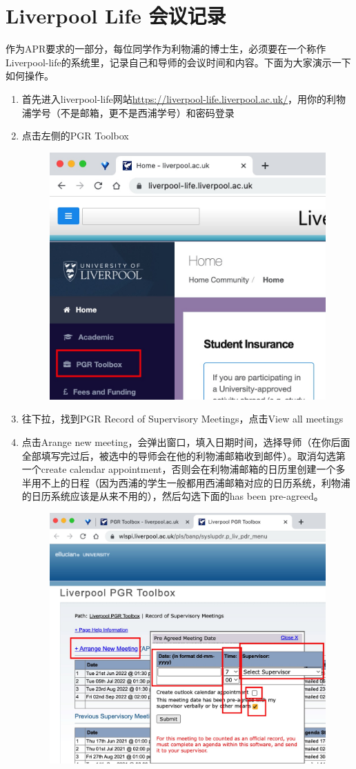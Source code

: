 \section{Liverpool Life 会议记录}
\label{section:meeting_record}
作为APR要求的一部分，每位同学作为利物浦的博士生，必须要在一个称作Liverpool-life的系统里，记录自己和导师的会议时间和内容。下面为大家演示一下如何操作。

\begin{enumerate}
    \item 首先进入liverpool-life网站\url{https://liverpool-life.liverpool.ac.uk/}，用你的利物浦学号（不是邮箱，更不是西浦学号）和密码登录
    \item 点击左侧的PGR Toolbox
    \begin{figure}[H]
        \centering
        \includegraphics[width=0.5\columnwidth]{author-folder/Kai.Wu/meeting_record_figures/toolbox.jpg}
    \end{figure}
    \item 往下拉，找到PGR Record of Supervisory Meetings，点击View all meetings
    \item 点击Arange new meeting，会弹出窗口，填入日期时间，选择导师（在你后面全部填写完过后，被选中的导师会在他的利物浦邮箱收到邮件）。取消勾选第一个create calendar appointment，否则会在利物浦邮箱的日历里创建一个多半用不上的日程（因为西浦的学生一般都用西浦邮箱对应的日历系统，利物浦的日历系统应该是从来不用的），然后勾选下面的has been pre-agreed。
    \begin{figure}[H]
        \centering
        \includegraphics[width=0.5\columnwidth]{author-folder/Kai.Wu/meeting_record_figures/arange_new_meeting.jpg}

\end{figure}
\end{enumerate}
